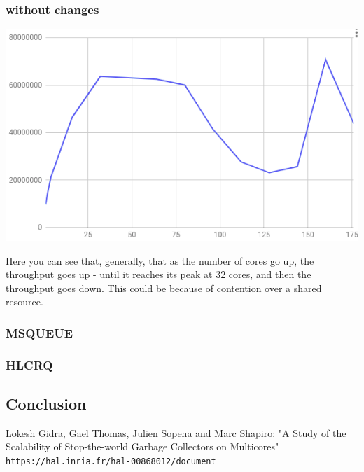 \documentclass{article}
\begin{document}
 \subsubsection{without changes}

 \includegraphics[width=\textwidth]{graph-no-changes.png}

 Here you can see that, generally, that as the number of cores go up, the throughput goes up - until it reaches its peak at 32 cores, and then the throughput goes down. This could be because of contention over a shared resource.
 

 \subsubsection{MSQUEUE}

 \subsubsection{HLCRQ}

 \subsection{Conclusion}

  \medskip
  \newpage

  \begin{thebibliography}{9}
      Lokesh Gidra, Gael Thomas, Julien Sopena and Marc Shapiro: "A Study of the Scalability of Stop-the-world Garbage Collectors on Multicores"
      \\\texttt{https://hal.inria.fr/hal-00868012/document}
  \end{thebibliography}
\end{document}
